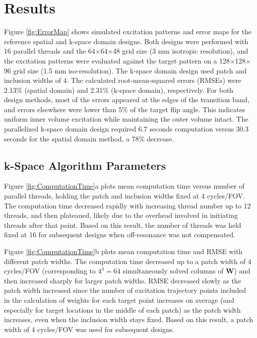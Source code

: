 \section*{Results}


Figure \ref{fig:ErrorMap} shows simulated excitation patterns and error maps for the reference spatial and k-space domain designs. 
Both designs were performed with 16 parallel threads and the 64$\times$64$\times$48 grid size (3 mm isotropic resolution), 
and the excitation patterns were evaluated against the target pattern on a 128$\times$128$\times$96 grid size (1.5 mm iso-resolution). 
The k-space domain design used patch and inclusion widths of 4.
The calculated root-mean-squared errors (RMSEs) were 2.13\% (spatial domain) and 2.31\% (k-space domain), 
respectively. 
For both design methods, most of the errors appeared at the edges of the transition band, 
and errors elsewhere were lower than 5\% of the target flip angle. 
This indicates uniform inner volume excitation while maintaining the outer volume intact. 
The parallelized k-space domain design required 6.7 seconds computation versus 30.3 seconds for the spatial domain method, a 78\% decrease.


\subsection*{k-Space Algorithm Parameters}
Figure \ref{fig:ComputationTime}a plots mean computation time versus number of parallel threads,
holding the patch and inclusion widths fixed at 4 cycles/FOV. 
The computation time decreased rapidly with increasing thread number up to 12 threads, 
and then plateaued, likely due to the overhead involved in initiating threads after that point.
Based on this result, the number of threads was held fixed at 16 for subsequent designs when off-resonance was not compensated.

\par Figure \ref{fig:ComputationTime}b plots mean computation time and RMSE with different patch widths. 
The computation time decreased up to a patch width of 4 cycles/FOV (corresponding to $4^3 = 64$ simultaneously solved columns of $\bm{W}$) 
and then increased sharply for larger patch widths. 
RMSE decreased slowly as the patch width increased since the number of excitation trajectory points included in the calculation of weights for each 
target point increases on average (and especially for target locations in the middle of each patch) as the patch width increases, 
even when the inclusion width stays fixed.
Based on this result, a patch width of 4 cycles/FOV was used for subsequent designs.

